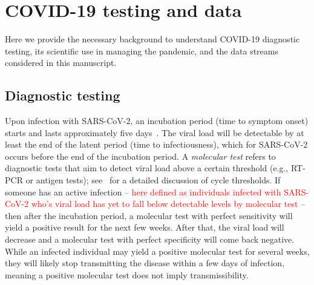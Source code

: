 \documentclass[11pt]{amsart}
\numberwithin{equation}{section}
\theoremstyle{plain}
\begin{document}


 \section{COVID-19 testing and data}
 \label{section:data}

Here we provide the necessary background to understand COVID-19 diagnostic testing, its scientific use in managing the pandemic, and the data streams considered in this manuscript.

\subsection{Diagnostic testing}
\label{section:testinginfo}

 Upon infection with SARS-CoV-2, an incubation period (time to symptom onset) starts and lasts approximately five days~\citep{Lauer2020}.  The viral load will be detectable by at least the end of the latent period (time to infectiousness), which for SARS-CoV-2 occurs before the end of the incubation period.  A \emph{molecular test} refers to diagnostic tests that aim to detect viral load above a certain threshold (e.g., RT-PCR or antigen tests); see~\cite{Mina2020} for a detailed discussion of cycle thresholds. If someone has an active infection -- \textcolor{red}{here defined as individuals infected with SARS-CoV-2 who's viral load has yet to fall below detectable levels by molecular test} -- then after the incubation period, a molecular test with perfect sensitivity will yield a positive result for the next few weeks.  After that, the viral load will decrease and a molecular test with perfect specificity will come back negative. While an infected individual may yield a positive molecular test for several weeks, they will likely stop transmitting the disease within a few days of infection, meaning a positive molecular test does not imply transmissibility.
\end{document}
